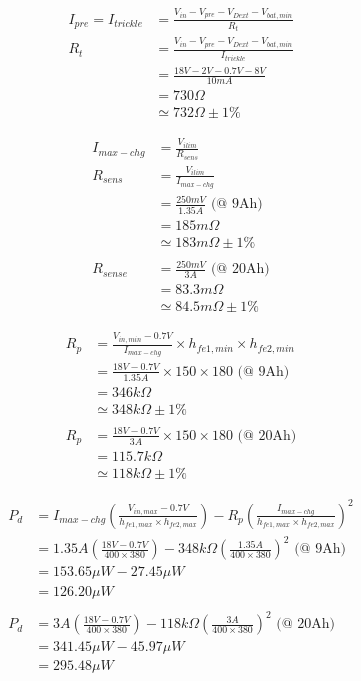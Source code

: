 \documentclass[11pt]{article} %
\begin{document}
\begin{align*}
I_{pre} = I_{trickle} &= \frac{V_{in} - V_{pre} - V_{Dext} - V_{bat,min}}{R_t} \\
R_t &=  \frac{V_{in} - V_{pre} - V_{Dext} - V_{bat,min}}{I_{trickle}} \\
&= \frac{18V - 2V - 0.7V - 8V}{10mA} \\
&= 730\Omega \\
&\simeq 732\Omega \pm 1\% \tag{7}
\end{align*}

\begin{align*}
I_{max-chg} &= \frac{V_{ilim}}{R_{sens}} \\
R_{sens} &= \frac{V_{ilim}}{I_{max-chg}} \\
&= \frac{250mV}{1.35A} \text{ (@ 9Ah)} \\
&= 185m\Omega \\
&\simeq 183m\Omega \pm 1\% \tag{8} \\
\\
R_{sense} &= \frac{250mV}{3A} \text{ (@ 20Ah)} \\
&= 83.3m\Omega \\
&\simeq 84.5m\Omega \pm 1\% \tag{9}
\end{align*}

\begin{align*}
R_p &= \frac{V_{in,min} - 0.7V}{I_{max-chg}} \times h_{fe1,min} \times h_{fe2,min} \\
&= \frac{18V - 0.7V}{1.35A} \times 150 \times 180 \text{ (@ 9Ah)} \\
&= 346k\Omega \\
&\simeq 348k\Omega \pm 1\% \tag{10} \\
\\
R_p &= \frac{18V - 0.7V}{3A} \times 150 \times 180 \text{ (@ 20Ah)} \\
&= 115.7k\Omega \\
&\simeq 118k\Omega \pm 1\% \tag{11}
\end{align*}

\begin{align*}
P_d &= I_{max-chg}\left(\frac{V_{in,max} - 0.7V}{h_{fe1,max} \times h_{fe2,max}}\right) - R_p\left(\frac{I_{max-chg}}{h_{fe1,max}\times h_{fe2,max}}\right)^2 \\
&= 1.35A\left(\frac{18V - 0.7V}{400 \times 380}\right) - 348k\Omega \left(\frac{1.35A}{400 \times 380}\right)^2 \text{ (@ 9Ah)} \\
&= 153.65\mu W - 27.45\mu W \\
&= 126.20\mu W \tag{12} \\
\\
P_d &= 3A\left(\frac{18V - 0.7V}{400 \times 380}\right) - 118k\Omega \left(\frac{3A}{400 \times 380}\right)^2 \text{ (@ 20Ah)} \\
&= 341.45\mu W - 45.97\mu W \\
&= 295.48\mu W \tag{13}
\end{align*}
\end{document}
